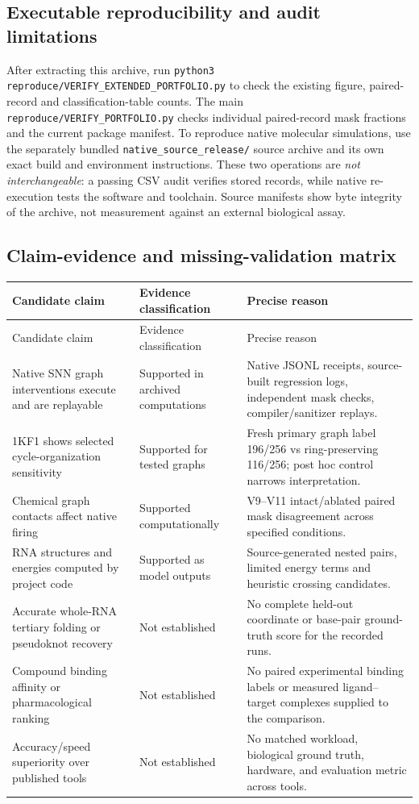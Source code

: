 \documentclass[11pt,a4paper]{article}
\begin{document}
\subsection{Executable reproducibility and audit limitations}
After extracting this archive, run \texttt{python3 reproduce/VERIFY\_EXTENDED\_PORTFOLIO.py} to check the existing figure, paired-record and classification-table counts. The main \texttt{reproduce/VERIFY\_PORTFOLIO.py} checks individual paired-record mask fractions and the current package manifest. To reproduce native molecular simulations, use the separately bundled \texttt{native\_source\_release/} source archive and its own exact build and environment instructions. These two operations are \emph{not interchangeable}: a passing CSV audit verifies stored records, while native re-execution tests the software and toolchain. Source manifests show byte integrity of the archive, not measurement against an external biological assay.

\subsection{Claim-evidence and missing-validation matrix}
\begin{center}\footnotesize
\begin{longtable}{p{}p{}p{}}
\toprule
Candidate claim & Evidence classification & Precise reason\\\midrule\endfirsthead\toprule Candidate claim & Evidence classification & Precise reason\\\midrule\endhead
Native SNN graph interventions execute and are replayable & Supported in archived computations & Native JSONL receipts, source-built regression logs, independent mask checks, compiler/sanitizer replays.\\
1KF1 shows selected cycle-organization sensitivity & Supported for tested graphs & Fresh primary graph label 196/256 vs ring-preserving 116/256; post hoc control narrows interpretation.\\
Chemical graph contacts affect native firing & Supported computationally & V9--V11 intact/ablated paired mask disagreement across specified conditions.\\
RNA structures and energies computed by project code & Supported as model outputs & Source-generated nested pairs, limited energy terms and heuristic crossing candidates.\\
Accurate whole-RNA tertiary folding or pseudoknot recovery & Not established & No complete held-out coordinate or base-pair ground-truth score for the recorded runs.\\
Compound binding affinity or pharmacological ranking & Not established & No paired experimental binding labels or measured ligand--target complexes supplied to the comparison.\\
Accuracy/speed superiority over published tools & Not established & No matched workload, biological ground truth, hardware, and evaluation metric across tools.\\
\bottomrule
\end{longtable}
\end{center}
\end{document}
